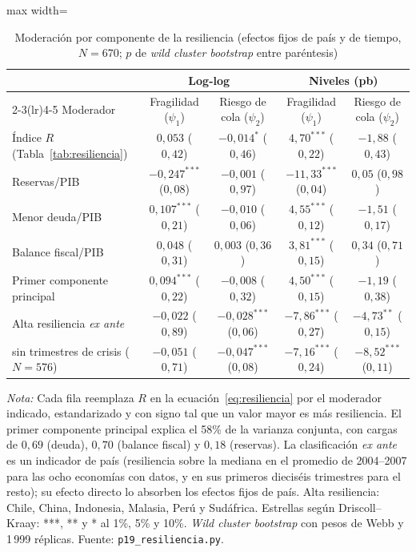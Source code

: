 \begin{table}[htbp]
\centering
\small
\caption[Componentes de la resiliencia]{Moderación por componente de la resiliencia (efectos fijos de país y de tiempo, $N=670$; $p$ de \textit{wild cluster bootstrap} entre paréntesis)}
\label{tab:resiliencia-variantes}
\begin{adjustbox}{max width=\linewidth}
\begin{tabular}{l cc cc}
\toprule
 & \multicolumn{2}{c}{Log-log} & \multicolumn{2}{c}{Niveles (pb)} \\
\cmidrule(lr){2-3}\cmidrule(lr){4-5}
Moderador & Fragilidad ($\psi_1$) & Riesgo de cola ($\psi_2$) & Fragilidad ($\psi_1$) & Riesgo de cola ($\psi_2$) \\
\midrule
Índice $R$ (Tabla~\ref{tab:resiliencia}) & $0{,}053$ ($0{,}42$) & $-0{,}014^{*}$ ($0{,}46$) & $4{,}70^{***}$ ($0{,}22$) & $-1{,}88$ ($0{,}43$) \\
\addlinespace
Reservas/PIB & $-0{,}247^{***}$ ($0{,}08$) & $-0{,}001$ ($0{,}97$) & $-11{,}33^{***}$ ($0{,}04$) & $0{,}05$ ($0{,}98$) \\
Menor deuda/PIB & $0{,}107^{***}$ ($0{,}21$) & $-0{,}010$ ($0{,}06$) & $4{,}55^{***}$ ($0{,}12$) & $-1{,}51$ ($0{,}17$) \\
Balance fiscal/PIB & $0{,}048$ ($0{,}31$) & $0{,}003$ ($0{,}36$) & $3{,}81^{***}$ ($0{,}15$) & $0{,}34$ ($0{,}71$) \\
\addlinespace
Primer componente principal & $0{,}094^{***}$ ($0{,}22$) & $-0{,}008$ ($0{,}32$) & $4{,}50^{***}$ ($0{,}15$) & $-1{,}19$ ($0{,}38$) \\
\addlinespace
Alta resiliencia \textit{ex ante} & $-0{,}022$ ($0{,}89$) & $-0{,}028^{***}$ ($0{,}06$) & $-7{,}86^{***}$ ($0{,}27$) & $-4{,}73^{**}$ ($0{,}15$) \\
\quad sin trimestres de crisis ($N=576$) & $-0{,}051$ ($0{,}71$) & $-0{,}047^{***}$ ($0{,}08$) & $-7{,}16^{***}$ ($0{,}24$) & $-8{,}52^{***}$ ($0{,}11$) \\
\bottomrule
\end{tabular}
\end{adjustbox}
\par\smallskip\parbox{0.95\linewidth}{\footnotesize \textit{Nota:} Cada fila reemplaza $R$ en la ecuación~\eqref{eq:resiliencia} por el moderador indicado, estandarizado y con signo tal que un valor mayor es más resiliencia. El primer componente principal explica el 58\% de la varianza conjunta, con cargas de $0{,}69$ (deuda), $0{,}70$ (balance fiscal) y $0{,}18$ (reservas). La clasificación \textit{ex ante} es un indicador de país (resiliencia sobre la mediana en el promedio de 2004--2007 para las ocho economías con datos, y en sus primeros dieciséis trimestres para el resto); su efecto directo lo absorben los efectos fijos de país. Alta resiliencia: Chile, China, Indonesia, Malasia, Perú y Sudáfrica. Estrellas según Driscoll--Kraay: ***, ** y * al 1\%, 5\% y 10\%. \textit{Wild cluster bootstrap} con pesos de Webb y 1\,999 réplicas. Fuente: \texttt{p19\_resiliencia.py}.}
\end{table}

